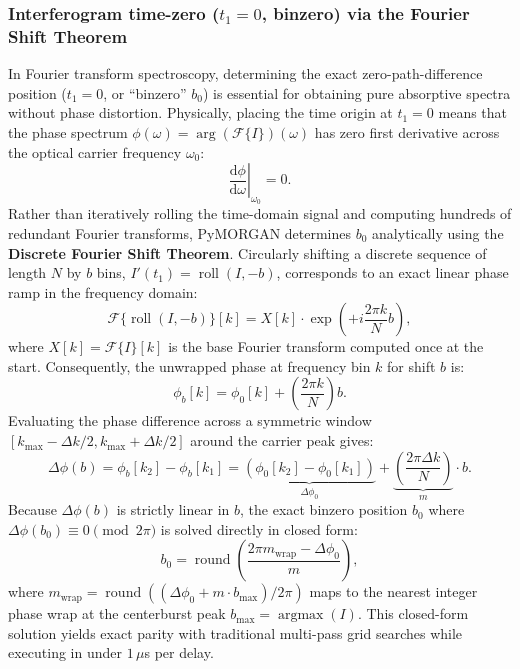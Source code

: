 \subsubsection{Interferogram time-zero ($t_1=0$, binzero) via the Fourier Shift Theorem}
In Fourier transform spectroscopy, determining the exact zero-path-difference position ($t_1=0$, or ``binzero'' $b_0$) is essential for obtaining pure absorptive spectra without phase distortion. Physically, placing the time origin at $t_1 = 0$ means that the phase spectrum $\phi(\omega) = \arg(\mathcal{F}\{I\})(\omega)$ has zero first derivative across the optical carrier frequency $\omega_0$:
\begin{equation}
  \left.\frac{\mathrm{d}\phi}{\mathrm{d}\omega}\right|_{\omega_0} = 0.
\end{equation}
Rather than iteratively rolling the time-domain signal and computing hundreds of redundant Fourier transforms, PyMORGAN determines $b_0$ analytically using the \textbf{Discrete Fourier Shift Theorem}. Circularly shifting a discrete sequence of length $N$ by $b$ bins, $I'(t_1) = \operatorname{roll}(I, -b)$, corresponds to an exact linear phase ramp in the frequency domain:
\begin{equation}
  \mathcal{F}\{\operatorname{roll}(I, -b)\}[k] = X[k] \cdot \exp\left(+i \frac{2\pi k}{N} b\right),
\end{equation}
where $X[k] = \mathcal{F}\{I\}[k]$ is the base Fourier transform computed once at the start. Consequently, the unwrapped phase at frequency bin $k$ for shift $b$ is:
\begin{equation}
  \phi_b[k] = \phi_0[k] + \left(\frac{2\pi k}{N}\right) b.
\end{equation}
Evaluating the phase difference across a symmetric window $[k_{\max} - \Delta k/2, k_{\max} + \Delta k/2]$ around the carrier peak gives:
\begin{equation}
  \Delta\phi(b) = \phi_b[k_2] - \phi_b[k_1] = \underbrace{(\phi_0[k_2] - \phi_0[k_1])}_{\Delta\phi_0} + \underbrace{\left(\frac{2\pi \Delta k}{N}\right)}_{m} \cdot b.
\end{equation}
Because $\Delta\phi(b)$ is strictly linear in $b$, the exact binzero position $b_0$ where $\Delta\phi(b_0) \equiv 0 \pmod{2\pi}$ is solved directly in closed form:
\begin{equation}
  b_0 = \operatorname{round}\left( \frac{2\pi m_{\text{wrap}} - \Delta\phi_0}{m} \right),
\end{equation}
where $m_{\text{wrap}} = \operatorname{round}((\Delta\phi_0 + m \cdot b_{\max}) / 2\pi)$ maps to the nearest integer phase wrap at the centerburst peak $b_{\max} = \operatorname{argmax}(I)$. This closed-form solution yields exact parity with traditional multi-pass grid searches while executing in under $1\,\mu$s per delay.

